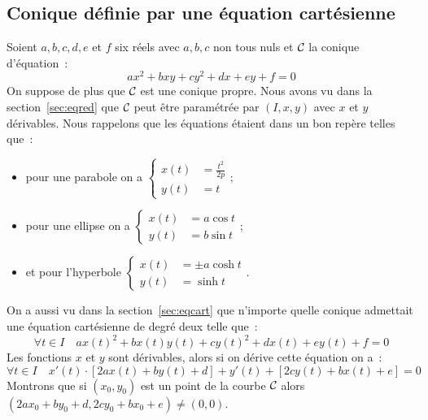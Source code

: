 \subsection{Conique définie par une équation cartésienne}
Soient $a,b,c,d,e$ et $f$ six réels avec $a,b,c$ non tous nuls et $\mathcal{C}_{{}}$ la conique d'équation~:
\begin{equation}
  ax^2+bxy+cy^2+dx+ey+f=0
\end{equation}
On suppose de plus que $\mathcal{C}_{{}}$ est une conique propre. Nous avons vu dans la section~\ref{sec:eqred} que $\mathcal{C}_{{}}$ peut être paramétrée par $(I,x,y)$ avec $x$ et $y$ dérivables. Nous rappelons que les équations étaient dans un bon repère telles que~:
\begin{itemize}
\item pour une parabole on a $\begin{cases} x(t) &= \frac{t^2}{2p} \\ y(t) &= t \end{cases}$;
\item pour une ellipse on a $\begin{cases} x(t) &= a\cos t\\ y(t) &= b\sin t \end{cases}$;
\item  et pour l'hyperbole $\begin{cases} x(t) &= \pm a\cosh t\\ y(t) &= \sinh t \end{cases}$.
\end{itemize}
On a aussi vu dans la section~\ref{sec:eqcart} que n'importe quelle conique admettait une équation cartésienne de degré deux telle que~:
\begin{equation}
\forall t \in I \quad   ax(t)^2+bx(t)y(t)+cy(t)^2+dx(t)+ey(t)+f=0
\end{equation}
Les fonctions $x$ et $y$ sont dérivables, alors si on dérive cette équation on a~:
\begin{equation}
  \forall t \in I \quad x'(t) \cdot [2ax(t)+by(t)+d]+y'(t)+[2cy(t)+bx(t)+e]=0
\end{equation}
Montrons que si $(x_0,y_0)$ est un point de la courbe $\mathcal{C}_{{}}$ alors $(2ax_0+by_0+d,2cy_0+bx_0+e)\neq (0,0)$.

